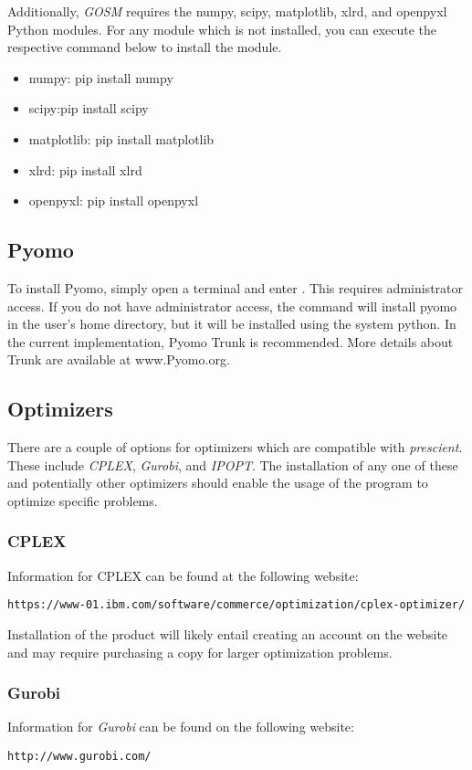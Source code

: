 Additionally, {\it GOSM} requires the numpy, scipy, matplotlib, xlrd, and openpyxl Python modules.
For any module which is not installed, you can execute the respective command below to install the module.
\begin{itemize}
\item numpy: pip install numpy
\item scipy:pip install scipy
\item matplotlib: pip install matplotlib
\item xlrd: pip install xlrd
\item openpyxl: pip install openpyxl
\end{itemize}

\subsection{Pyomo}
To install Pyomo, simply open a terminal and enter .
This requires administrator access. If you do not have administrator access, 
the command  will install pyomo in the user's 
home directory, but it will be installed using the system python.  In the current implementation,
Pyomo Trunk is recommended.  More details about Trunk are available at www.Pyomo.org.

\subsection{Optimizers}
There are a couple of options for optimizers which are compatible with \textit{prescient}. These include \textit{CPLEX}, \textit{Gurobi}, and \textit{IPOPT}.
The installation of any one of these and potentially other optimizers should enable the usage of the program to optimize specific problems.
\subsubsection{CPLEX}
Information for CPLEX can be found at the following website:
\begin{verbatim}
https://www-01.ibm.com/software/commerce/optimization/cplex-optimizer/
\end{verbatim}
Installation of the product will likely entail creating an account on the website and may require purchasing a copy for larger optimization problems.

\subsubsection{Gurobi}
Information for \textit{Gurobi} can be found on the following website:
\begin{verbatim}
http://www.gurobi.com/
\end{verbatim}

